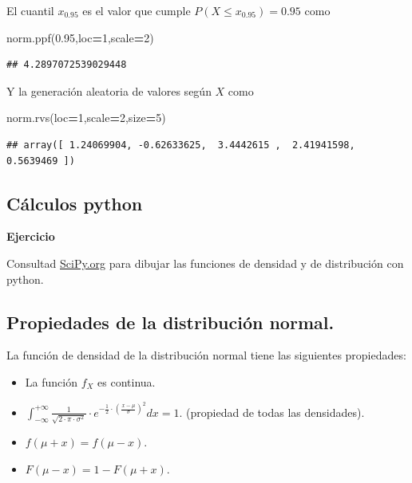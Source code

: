 \documentclass[]{book}
\newenvironment{Shaded}{\begin{snugshade}}{\end{snugshade}}
\newcommand{\DecValTok}[1]{\textcolor[rgb]{0.00,0.00,0.81}{#1}}
\newcommand{\FloatTok}[1]{\textcolor[rgb]{0.00,0.00,0.81}{#1}}
\newcommand{\NormalTok}[1]{#1}
\newcommand{\OperatorTok}[1]{\textcolor[rgb]{0.81,0.36,0.00}{\textbf{#1}}}
\providecommand{\tightlist}{%
  \setlength{\itemsep}{0pt}\setlength{\parskip}{0pt}}
\begin{document}
El cuantil \(x_{0.95}\) es el valor que cumple \(P(X\leq x_{0.95})=0.95\) como

\begin{Shaded}
\begin{Highlighting}[]
\NormalTok{norm.ppf(}\FloatTok{0.95}\NormalTok{,loc}\OperatorTok{=}\DecValTok{1}\NormalTok{,scale}\OperatorTok{=}\DecValTok{2}\NormalTok{)}
\end{Highlighting}
\end{Shaded}

\begin{verbatim}
## 4.2897072539029448
\end{verbatim}

Y la generación aleatoria de valores según \(X\) como

\begin{Shaded}
\begin{Highlighting}[]
\NormalTok{norm.rvs(loc}\OperatorTok{=}\DecValTok{1}\NormalTok{,scale}\OperatorTok{=}\DecValTok{2}\NormalTok{,size}\OperatorTok{=}\DecValTok{5}\NormalTok{)}
\end{Highlighting}
\end{Shaded}

\begin{verbatim}
## array([ 1.24069904, -0.62633625,  3.4442615 ,  2.41941598,  0.5639469 ])
\end{verbatim}

\hypertarget{cuxe1lculos-python}{%
\subsection{Cálculos python}\label{cuxe1lculos-python}}

\textbf{Ejercicio}

Consultad \href{https://docs.scipy.org/doc/scipy/reference/generated/scipy.stats.norm.html}{SciPy.org} para dibujar las funciones de densidad y de distribución con python.

\hypertarget{propiedades-de-la-distribuciuxf3n-normal.}{%
\subsection{Propiedades de la distribución normal.}\label{propiedades-de-la-distribuciuxf3n-normal.}}

La función de densidad de la
distribución normal tiene las siguientes propiedades:

\begin{itemize}
\tightlist
\item
  La función \(f_X\) es continua.
\item
  \(\int_{-\infty}^{+\infty} \frac{1}{\sqrt{2\cdot\pi\cdot \sigma^2}}\cdot e^{-\frac{1}{2}\cdot \left(\frac{x-\mu}{\sigma}\right)^2} dx =1.\) (propiedad de todas las densidades).
\item
  \(f(\mu+x)=f(\mu-x)\).
\item
  \(F(\mu-x)=1-F(\mu+x)\).
\end{itemize}
\end{document}
